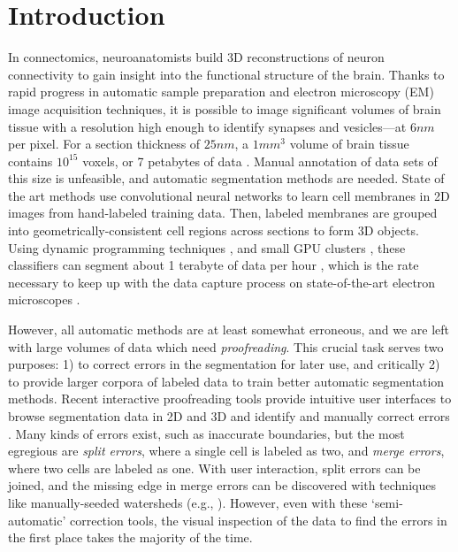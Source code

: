 \section{Introduction}


In connectomics, neuroanatomists build 3D reconstructions of neuron connectivity to gain insight into the functional structure of the brain. Thanks to rapid progress in automatic sample preparation and electron microscopy (EM) image acquisition techniques, it is possible to image significant volumes of brain tissue with a resolution high enough to identify synapses and vesicles---at $6nm$ per pixel. For a section thickness of $25nm$, a $1 mm^3$ volume of brain tissue contains $10^{15}$ voxels, or 7 petabytes of data . Manual annotation of data sets of this size is unfeasible, and automatic segmentation methods are needed. State of the art methods use convolutional neural networks to learn cell membranes in 2D images from hand-labeled training data. Then, labeled membranes are grouped into geometrically-consistent cell regions across sections to form 3D objects. Using dynamic programming techniques , and small GPU clusters , these classifiers can segment about 1 terabyte of data per hour , which is the rate necessary to keep up with the data capture process on state-of-the-art electron microscopes . 

However, all automatic methods are at least somewhat erroneous, and we are left with large volumes of data which need \emph{proofreading}. This crucial task serves two purposes: 1) to correct errors in the segmentation for later use, and critically 2) to provide larger corpora of labeled data to train better automatic segmentation methods. Recent interactive proofreading tools provide intuitive user interfaces to browse segmentation data in 2D and 3D and identify and manually correct errors \cite{raveler,mojo2,haehn_dojo_2014}. Many kinds of errors exist, such as inaccurate boundaries, but the most egregious are \emph{split errors}, where a single cell is labeled as two, and \emph{merge errors}, where two cells are labeled as one. With user interaction, split errors can be joined, and the missing edge in merge errors can be discovered with techniques like manually-seeded watersheds  (e.g., \cite{haehn_dojo_2014}).  However, even with these `semi-automatic' correction tools, the visual inspection of the data to find the errors in the first place takes the majority of the time.

